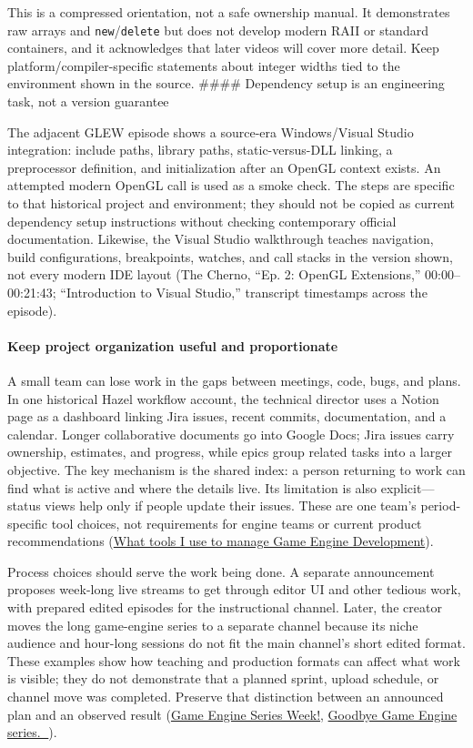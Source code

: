 This is a compressed orientation, not a safe ownership manual. It demonstrates raw arrays and \texttt{new}/\texttt{delete} but does not develop modern RAII or standard containers, and it acknowledges that later videos will cover more detail. Keep platform/compiler-specific statements about integer widths tied to the environment shown in the source. \#\#\#\# Dependency setup is an engineering task, not a version guarantee

The adjacent GLEW episode shows a source-era Windows/Visual Studio integration: include paths, library paths, static-versus-DLL linking, a preprocessor definition, and initialization after an OpenGL context exists. An attempted modern OpenGL call is used as a smoke check. The steps are specific to that historical project and environment; they should not be copied as current dependency setup instructions without checking contemporary official documentation. Likewise, the Visual Studio walkthrough teaches navigation, build configurations, breakpoints, watches, and call stacks in the version shown, not every modern IDE layout (The Cherno, ``Ep. 2: OpenGL Extensions,'' 00:00--00:21:43; ``Introduction to Visual Studio,'' transcript timestamps across the episode).

\paragraph{Keep project organization useful and proportionate}\label{keep-project-organization-useful-and-proportionate}

A small team can lose work in the gaps between meetings, code, bugs, and plans. In one historical Hazel workflow account, the technical director uses a Notion page as a dashboard linking Jira issues, recent commits, documentation, and a calendar. Longer collaborative documents go into Google Docs; Jira issues carry ownership, estimates, and progress, while epics group related tasks into a larger objective. The key mechanism is the shared index: a person returning to work can find what is active and where the details live. Its limitation is also explicit---status views help only if people update their issues. These are one team's period-specific tool choices, not requirements for engine teams or current product recommendations (\href{https://www.youtube.com/watch?v=XGYEk9rbGjU&t=3m11s}{What tools I use to manage Game Engine Development}).

Process choices should serve the work being done. A separate announcement proposes week-long live streams to get through editor UI and other tedious work, with prepared edited episodes for the instructional channel. Later, the creator moves the long game-engine series to a separate channel because its niche audience and hour-long sessions do not fit the main channel's short edited format. These examples show how teaching and production formats can affect what work is visible; they do not demonstrate that a planned sprint, upload schedule, or channel move was completed. Preserve that distinction between an announced plan and an observed result (\href{https://www.youtube.com/watch?v=Q4wHOx5av0w&t=0m1s}{Game Engine Series Week!}, \href{https://www.youtube.com/watch?v=4w9NYltdaew&t=0m3s}{Goodbye Game Engine series. 👋}).


